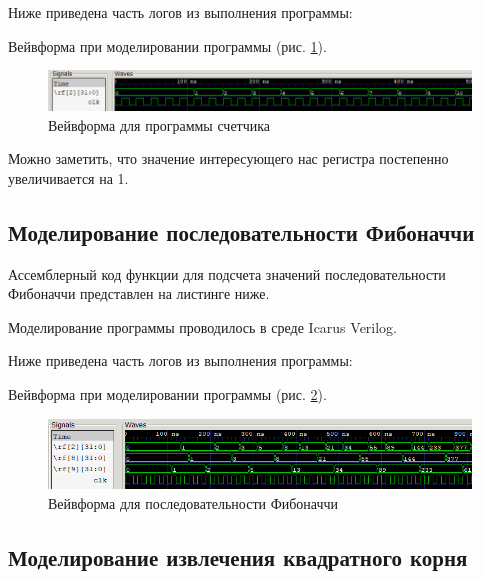 \documentclass[a4paper,14pt]{article}
\begin{document}
	Ниже приведена часть логов из выполнения программы:
	
	{\small {}}
	
	Вейвформа при моделировании программы (рис. \ref{fig:00wvf}).
	
	\begin{figure}[H]
		\centering
		\includegraphics[width=0.95\linewidth]{images/00_wvf}
		\caption{Вейвформа для программы счетчика}
		\label{fig:00wvf}
	\end{figure}

	Можно заметить, что значение интересующего нас регистра постепенно увеличивается на 1.
	
	
	\subsection{Моделирование последовательности Фибоначчи}
	
	Ассемблерный код функции для подсчета значений последовательности Фибоначчи представлен на листинге ниже.
	
	{\small {}}
	
	Моделирование программы проводилось в среде Icarus Verilog.
	
	Ниже приведена часть логов из выполнения программы:
	
	{\small {}}
	
	Вейвформа при моделировании программы (рис. \ref{fig:01wvf}).
	
	\begin{figure}[H]
		\centering
		\includegraphics[width=0.95\linewidth]{images/01_wvf}
		\caption{Вейвформа для последовательности Фибоначчи}
		\label{fig:01wvf}
	\end{figure}

	
	

	\subsection{Моделирование извлечения квадратного корня}
	
\end{document}
